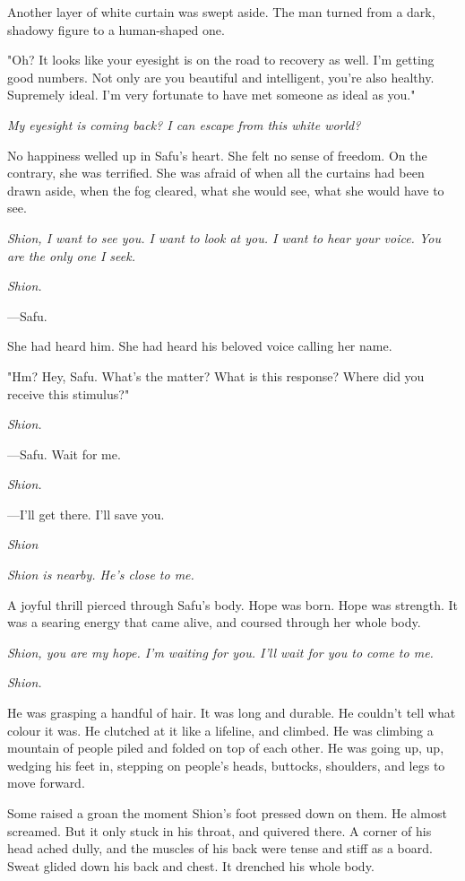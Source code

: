 Another layer of white curtain was swept aside. The man turned from a
dark, shadowy figure to a human-shaped one.

"Oh? It looks like your eyesight is on the road to recovery as well. I'm
getting good numbers. Not only are you beautiful and intelligent, you're
also healthy. Supremely ideal. I'm very fortunate to have met someone as
ideal as you."

\emph{My eyesight is coming back? I can escape from this white world?}

No happiness welled up in Safu's heart. She felt no sense of freedom. On
the contrary, she was terrified. She was afraid of when all the curtains
had been drawn aside, when the fog cleared, what she would see, what she
would have to see.

\emph{Shion, I want to see you. I want to look at you. I want to hear your
voice. You are the only one I seek.}

\emph{Shion.}

---Safu.

She had heard him. She had heard his beloved voice calling her name.

"Hm? Hey, Safu. What's the matter? What is this response? Where did you
receive this stimulus?"

\emph{Shion.}

---Safu. Wait for me.

\emph{Shion.}

---I'll get there. I'll save you.

\emph{Shion\el }

\emph{Shion is nearby. He's close to me.}

A joyful thrill pierced through Safu's body. Hope was born. Hope was
strength. It was a searing energy that came alive, and coursed through
her whole body.

\emph{Shion, you are my hope. I'm waiting for you. I'll wait for you to come
to me.}

\emph{Shion.}

\mybreak

He was grasping a handful of hair. It was long and durable. He couldn't
tell what colour it was. He clutched at it like a lifeline, and climbed.
He was climbing a mountain of people piled and folded on top of each
other. He was going up, up, wedging his feet in, stepping on people's
heads, buttocks, shoulders, and legs to move forward.

Some raised a groan the moment Shion's foot pressed down on them. He
almost screamed. But it only stuck in his throat, and quivered there. A
corner of his head ached dully, and the muscles of his back were tense
and stiff as a board. Sweat glided down his back and chest. It drenched
his whole body.

